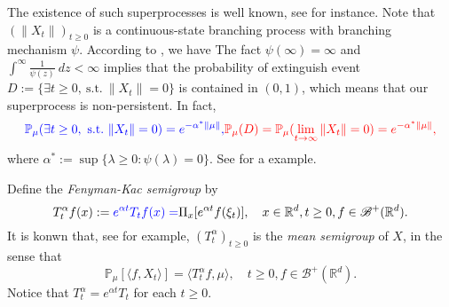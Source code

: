 \documentclass[12pt,oneside,english]{amsart}
\theoremstyle{plain}
\theoremstyle{definition}
\numberwithin{equation}{section}
\newcommand{\added}[1]{{\color{blue}#1}}\newcommand{\deleted}[1]{{\color{red}#1}}
\begin{document}
    The existence of such superprocesses is well known, see \cite{EB} for instance.
    Note that $(\|X_t\|)_{t\geq 0}$ is a continuous-state branching process with branching mechanism $\psi$.
\added{
    According to \cite[Theorem 12.5 \& Theorem 12.7]{Kyprianou2014Fluctuations}, we have
}\deleted{
    The fact $\psi(\infty)=\infty$ and $\int^{\infty}\frac{1}{\psi(z)}~dz<\infty$ implies that the probability of extinguish event $D:= \{\exists t\geq 0,~\text{s.t.}~\|X_t\|=0\}$ is contained in $(0,1)$, which means that our superprocess is non-persistent.
    In fact,
}
\begin{equation}
\added{
    \mathbb{P}_{\mu} (\exists t\geq 0,~\text{s.t.}~\|X_t\|=0)
    = e^{-\alpha^* \|\mu\|}, 
}\deleted{
    \mathbb{P}_{\mu}(D)
    = \mathbb{P}_{\mu} (\lim_{t \to \infty}\|X_t\|=0 )
    = e^{-\alpha^* \|\mu\|},
}
\end{equation} 
    where $\alpha^* := \sup\{\lambda \geq 0: \psi(\lambda) = 0\}$.
\deleted{ 
    See {\cite[Theorem 12.5 \& Theorem 12.7]{Kyprianou2014Fluctuations} }for a example.
    }

    Define the \emph{Fenyman-Kac semigroup} by
\begin{equation}\label{meansemigroup}
    T^{\alpha}_t f(x)
    :=
\added{ e^{\alpha t} T_t f(x) =}
    \Pi_x [e^{\alpha t}f(\xi_t)],
    \quad x\in \mathbb{R}^d,t\geq 0, f\in \mathscr B^+(\mathbb R^d).
\end{equation}
    It is konwn that, see \cite[Proposition 2.27]{Li2011Measure-valued} for example, $(T^\alpha_t)_{t\geq 0}$ is the \emph{mean semigroup} of $X$, in the sense that
\begin{equation}\label{eq:meanformula}
    \mathbb{P}_{\mu}[\langle f, X_t \rangle]
    = \langle T_t^\alpha f, \mu \rangle,
    \quad t\geq 0, f\in \mathscr B^+(\mathbb R^d).
\end{equation}
\deleted{Notice that $T^{\alpha}_t =e^{\alpha t}T_t$ for each $t \geq 0$.}
\end{document}
